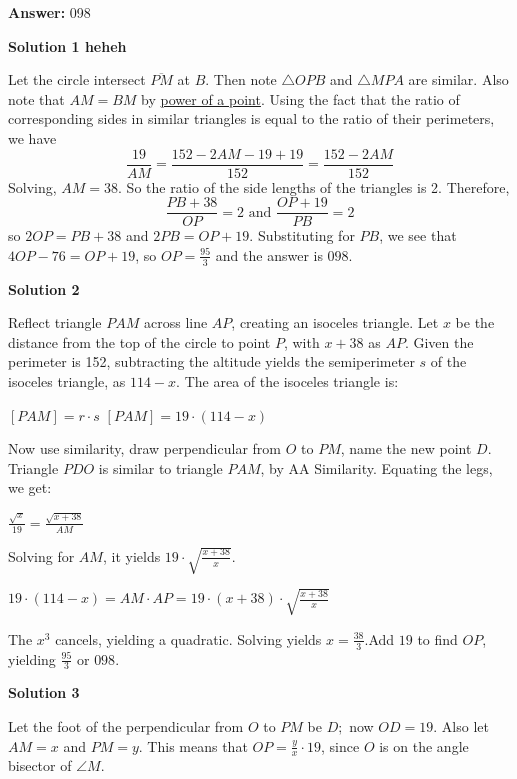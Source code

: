 \begin{enumerate}
 
 \textbf{Answer: }098



\textbf{Solution 1 heheh}

Let the circle intersect $\overline{PM}$ at $B$. Then note $\triangle OPB$ and $\triangle MPA$ are similar. Also note that $AM = BM$ by \href{https://artofproblemsolving.com/wiki/index.php?title=Power\_of\_a\_point}{power of a point}. Using the fact that the ratio of corresponding sides in similar triangles is equal to the ratio of their perimeters, we have
 \[\frac{19}{AM} = \frac{152-2AM-19+19}{152} = \frac{152-2AM}{152}\]Solving, $AM = 38$. So the ratio of the side lengths of the triangles is 2. Therefore,
 \[\frac{PB+38}{OP}= 2 \text{ and } \frac{OP+19}{PB} = 2\]so $2OP = PB+38$ and $2PB = OP+19.$ Substituting for $PB$, we see that $4OP-76 = OP+19$, so $OP = \frac{95}3$ and the answer is $\boxed{098}$.

 



\textbf{Solution 2}

Reflect triangle $PAM$ across line $AP$, creating an isoceles triangle. Let $x$ be the distance from the top of the circle to point $P$, with $x + 38$ as $AP$. Given the perimeter is 152, subtracting the altitude yields the semiperimeter $s$ of the isoceles triangle, as $114 - x$. The area of the isoceles triangle is:

 $[PAM] = r \cdot s$
$[PAM] = 19 \cdot (114 - x)$

 Now use similarity, draw perpendicular from $O$ to $PM$, name the new point $D$. Triangle $PDO$ is similar to triangle $PAM$, by AA Similarity. Equating the legs, we get:

 $\frac{\sqrt{x}}{19} = \frac{\sqrt{x + 38}}{AM}$

 Solving for $AM$,  it yields $19 \cdot \sqrt{\frac{x + 38}{x}}$.

 $19 \cdot (114 - x) = AM \cdot AP = 19 \cdot (x + 38) \cdot \sqrt{\frac{x + 38}{x}}$

 The $x^3$ cancels, yielding a quadratic. Solving yields $x = \frac{38}{3}$.Add $19$ to find $OP$, yielding $\frac{95}{3}$ or $\boxed{098}$.

 



\textbf{Solution 3}

Let the foot of the perpendicular from $O$ to $PM$ be $D;$ now $OD=19.$ Also let $AM=x$ and $PM=y.$ This means that $OP=\frac{y}{x}\cdot 19$, since $O$ is on the angle bisector of $\angle M.$


\end{enumerate}
